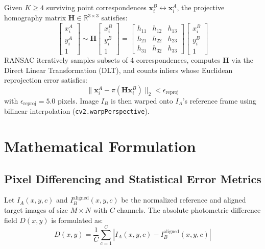 \documentclass[conference]{IEEEtran}
\begin{document}
Given $K \ge 4$ surviving point correspondences $\mathbf{x}_i^B \leftrightarrow \mathbf{x}_i^A$, the projective homography matrix $\mathbf{H} \in \mathbb{R}^{3 \times 3}$ satisfies:
\begin{equation}
\begin{bmatrix} x_i^A \\ y_i^A \\ 1 \end{bmatrix} \sim \mathbf{H} \begin{bmatrix} x_i^B \\ y_i^B \\ 1 \end{bmatrix} = \begin{bmatrix} h_{11} & h_{12} & h_{13} \\ h_{21} & h_{22} & h_{23} \\ h_{31} & h_{32} & h_{33} \end{bmatrix} \begin{bmatrix} x_i^B \\ y_i^B \\ 1 \end{bmatrix}
\end{equation}
RANSAC iteratively samples subsets of 4 correspondences, computes $\mathbf{H}$ via the Direct Linear Transformation (DLT), and counts inliers whose Euclidean reprojection error satisfies:
\begin{equation}
\|\mathbf{x}_i^A - \pi(\mathbf{H} \mathbf{x}_i^B)\|_2 < \epsilon_{\text{reproj}}
\end{equation}
with $\epsilon_{\text{reproj}} = 5.0$ pixels. Image $I_B$ is then warped onto $I_A$'s reference frame using bilinear interpolation (\texttt{cv2.warpPerspective}).

\section{Mathematical Formulation}

\subsection{Pixel Differencing and Statistical Error Metrics}
Let $I_A(x, y, c)$ and $I_B^{\text{aligned}}(x, y, c)$ be the normalized reference and aligned target images of size $M \times N$ with $C$ channels. The absolute photometric difference field $D(x, y)$ is formulated as:
\begin{equation}
D(x, y) = \frac{1}{C}\sum_{c=1}^{C} \left| I_A(x, y, c) - I_B^{\text{aligned}}(x, y, c) \right|
\end{equation}
\end{document}
